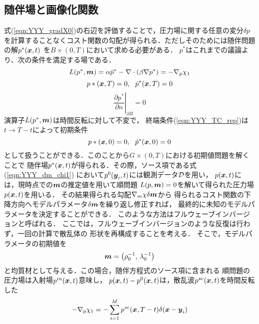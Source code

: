 \subsection{随伴場と画像化関数}
式(\ref{eqn:YYY_gradX0})の右辺を評価することで，圧力場に関する任意の変分$\delta p$
を計算することなくコスト関数の勾配が得られる．ただしそのためには随伴問題の解$p^*(\mbox{\boldmath $x$},t)$
を$B \times (0,T)$において求める必要がある．
$p^*$はこれまでの議論より、次の条件を満足する場である．
\begin{equation}
	L(p^*,\mbox{\boldmath $m$})=
	\alpha \ddot{p}^* -\nabla\cdot \left( \beta \nabla p^* \right)
	=	
	-\nabla_p\chi_1
	\label{eqn:YYY_adj_PDE_rep}
\end{equation}
\begin{equation}
	p*(\mbox{\boldmath $x$},T)=0, \ \ \dot{p}^*(\mbox{\boldmath $x$},T)=0
	\label{eqn:YYY_TC_rep}
\end{equation}
\begin{equation}
	\left. \frac{\partial p^*}{\partial n}\right|_{\partial B}=0
	\label{eqn:YYY_BC_rep}
\end{equation}
演算子$L(p^*,\mbox{\boldmath $m$})$は時間反転に対して不変で，
終端条件(\ref{eqn:YYY_TC_rep})は$t\rightarrow T-t$によって初期条件
\begin{equation}
	p*(\mbox{\boldmath $x$},0)=0, \ \ \dot{p}^*(\mbox{\boldmath $x$},0)=0
	\label{eqn:YYY_IC_adj}
\end{equation}
として扱うことができる．このことから$G\times (0,T)$における初期値問題を解くことで
随伴場$p^*(\mbox{\boldmath $x$},t)$が得られる．その際，ソース項である式(\ref{eqn:YYY_dm_chi1})
において$p^{0}(\mbox{\boldmath $y$}_i,t)$には観測データ${\cal D}$を用い，
$p(\mbox{\boldmath $x$},t)$には，現時点での$\mbox{\boldmath $m$}$の推定値を用いて順問題
$L(p,\mbox{\boldmath $m$})=0$を解いて得られた圧力場$p(\mbox{\boldmath $x$},t)$を用いる．
その結果得られる勾配$\nabla_m\chi \delta \mbox{\boldmath $m$}$から
得られるコスト関数の下降方向へモデルパラメータ$\delta \mbox{\boldmath $m$}$を繰り返し修正すれば，
最終的に未知のモデルパラメータを決定することができる．
このような方法はフルウェーブインバージョンと呼ばれる．
ここでは，フルウェーブインバージョンのような反復は行わず，一回の計算で散乱体の
形状を再構成することを考える．
そこで，モデルパラメータの初期値を
\begin{equation}
	\mbox{\boldmath $m$}=\left(\rho_0^{-1},\, \lambda_0^{-1} \right)
	\label{eqn:YYY_16}
\end{equation}
と均質材として与える．この場合，随伴方程式のソース項に含まれる
順問題の圧力場は入射場$p^{in}(\mbox{\boldmath $x$},t)$意味し，
$p(\mbox{\boldmath $x$},t)-p^{0}(\mbox{\boldmath $x$},t)$は，散乱波$p^{sc}(\mbox{\boldmath $x$},t)$を時間反転した
\begin{equation}
	-\nabla_p\chi_1 = 
	-\sum_{i=1}^M p^{sc}(\mbox{\boldmath $x$},T-t)\delta(\mbox{\boldmath $x$}-\mbox{\boldmath $y$}_i)
	\label{eqn:YYY_17}
\end{equation}

